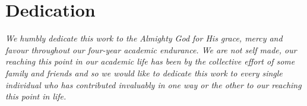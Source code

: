 \chapter*{Dedication}

\textit{We humbly dedicate this work to the Almighty God for His grace, mercy and favour throughout our four-year academic endurance. We are not self made, our reaching this point in our academic life has been by the collective effort of some family and friends and so we would like to dedicate this work to every single individual who has contributed invaluably in one way or the other to our reaching this point in life. }